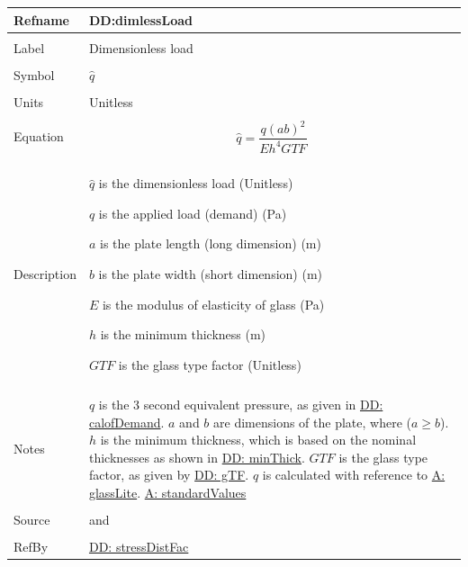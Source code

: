 \documentclass[12pt]{article}
\begin{document}
\noindent \begin{minipage}{\textwidth}
          \begin{tabular}{>{\raggedright}p{}>{\raggedright\arraybackslash}p{}}
          \toprule \textbf{Refname} & \textbf{DD:dimlessLoad}
          \label{DD:dimlessLoad}
          \\ \midrule \\
          Label & Dimensionless load
          \\ \midrule \\
          Symbol & $\hat{q}$
          \\ \midrule \\
          Units & Unitless
          \\ \midrule \\
          Equation & \begin{displaymath}
                     \hat{q}=\frac{q \left(a b\right)^{2}}{E h^{4} GTF}
                     \end{displaymath}
          \\ \midrule \\
          Description & \begin{symbDescription}
                        \item{$\hat{q}$ is the dimensionless load (Unitless)}
                        \item{$q$ is the applied load (demand) (Pa)}
                        \item{$a$ is the plate length (long dimension) (m)}
                        \item{$b$ is the plate width (short dimension) (m)}
                        \item{$E$ is the modulus of elasticity of glass (Pa)}
                        \item{$h$ is the minimum thickness (m)}
                        \item{$GTF$ is the glass type factor (Unitless)}
                        \end{symbDescription}
          \\ \midrule \\
          Notes & $q$ is the 3 second equivalent pressure, as given in \hyperref[DD:calofDemand]{DD: calofDemand}.
                  $a$ and $b$ are dimensions of the plate, where ($a\geq{}b$).
                  $h$ is the minimum thickness, which is based on the nominal thicknesses as shown in \hyperref[DD:minThick]{DD: minThick}.
                  $GTF$ is the glass type factor, as given by \hyperref[DD:gTF]{DD: gTF}.
                  $\hat{q}$ is calculated with reference to \hyperref[assumpGL]{A: glassLite}.
                  \hyperref[assumpSV]{A: standardValues}
          \\ \midrule \\
          Source & \cite{astm2009} and \cite[(Eq. 7)]{campidelli}
          \\ \midrule \\
          RefBy & \hyperref[DD:stressDistFac]{DD: stressDistFac}
          \\ \bottomrule
          \end{tabular}
          \end{minipage}
\end{document}
